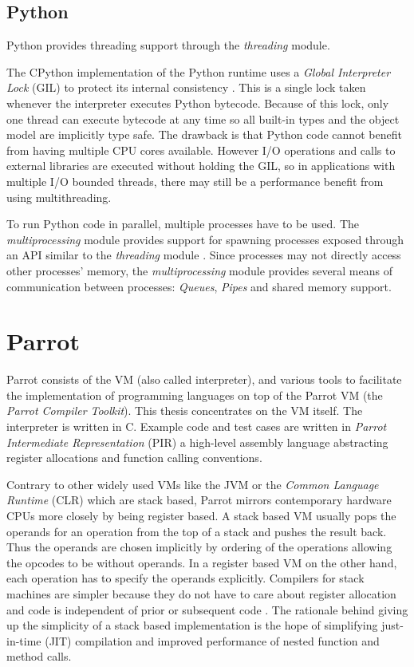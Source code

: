 \documentclass[bachelor,english]{hgbthesis}
\begin{document}
\section{Python}

Python provides threading support through the \textit{threading} module.

The CPython implementation of the Python runtime uses a \textit{Global Interpreter Lock} (GIL) to protect its internal consistency \cite{PythonThreadingManual}. This is a single lock taken whenever the interpreter executes Python bytecode. Because of this lock, only one thread can execute bytecode at any time so all built-in types and the object model are implicitly type safe. The drawback is that Python code cannot benefit from having multiple CPU cores available. However I/O operations and calls to external libraries are executed without holding the GIL, so in applications with multiple I/O bounded threads, there may still be a performance benefit from using multithreading.

To run Python code in parallel, multiple processes have to be used. The \textit{multiprocessing} module provides support for spawning processes exposed through an API similar to the \textit{threading} module \cite{PythonMultiProcessingManual}. Since processes may not directly access other processes' memory, the \textit{multiprocessing} module provides several means of communication between processes: \textit{Queues}, \textit{Pipes} and shared memory support.

\chapter{Parrot}

Parrot consists of the VM (also called interpreter), and various tools to facilitate the implementation of programming languages on top of the Parrot VM (the \textit{Parrot Compiler Toolkit}). This thesis concentrates on the VM itself. The interpreter is written in C. Example code and test cases are written in \textit{Parrot Intermediate Representation} (PIR) a high-level assembly language abstracting register allocations and function calling conventions.

Contrary to other widely used VMs like the JVM or the \textit{Common Language Runtime} (CLR) which are stack based, Parrot mirrors contemporary hardware CPUs more closely by being register based. A stack based VM usually pops the operands for an operation from the top of a stack and pushes the result back. Thus the operands are chosen implicitly by ordering of the operations allowing the opcodes to be without operands. In a register based VM on the other hand, each operation has to specify the operands explicitly. Compilers for stack machines are simpler because they do not have to care about register allocation and code is independent of prior or subsequent code \cite{VMShowdown}. The rationale behind giving up the simplicity of a stack based implementation is the hope of simplifying just-in-time (JIT) compilation and improved performance of nested function and method calls.
\end{document}
